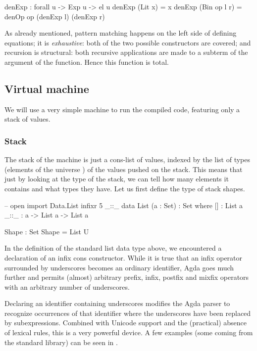 \begin{code}
  denExp : forall {u} -> Exp u -> el u
  denExp (Lit x) = x
  denExp (Bin op l r) = denOp op (denExp l) (denExp r)
\end{code}\label{sec:simple-denExp}

\noindent As already mentioned, pattern matching happens on the left side of defining equations;
it is \emph{exhaustive}: both of the two possible constructors are covered; and recursion
is structural: both recursive applications are made to a subterm of the argument of the function.
Hence this function is total.

\subsection{Virtual machine}

We will use a very simple machine to run the compiled code, featuring only a stack
of values.

\subsubsection{Stack}

The stack of the machine is just a cons-list of values, indexed by the list
of types (elements of the universe ) of the values pushed on the stack.
This means that just by looking at the type of the stack, we can tell how many
elements it contains and what types they have. Let us first define the type
of stack shapes.
\begin{code}
  -- open import Data.List
  infixr 5 _::_
  data List (a : Set) : Set where
    [] : List a
    _::_ : a -> List a -> List a
\end{code}
\begin{code}
  Shape : Set
  Shape = List U
\end{code}
\label{sec:fixity} In the definition of the standard list data type above,
we encountered a declaration of an infix cons constructor. While it is true that
an infix operator surrounded by underscores becomes an ordinary identifier,
Agda goes much further and permits (almost) arbitrary prefix, infix, postfix
and mixfix operators with an arbitrary number of underscores.

Declaring an identifier containing underscores modifies the Agda parser
to recognize occurrences of that identifier where the underscores have been
replaced by subexpressions. Combined with Unicode support and the (practical) absence
of lexical rules, this is a very powerful device. A few examples (some coming
from the standard library) can be seen
in .

